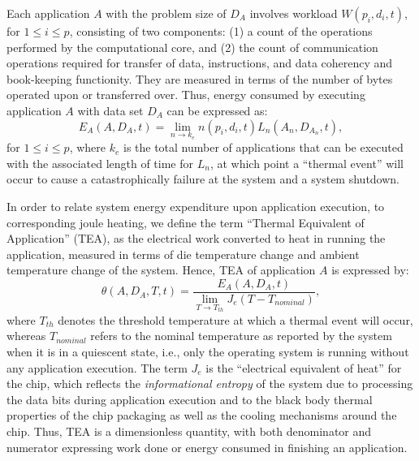 \documentclass[times, 10pt,twocolumn]{IEEEtran}
\begin{document}
Each application $A$ with the problem size of $D_{A}$ involves
workload $W(p_{i},d_{i},t)$, for $1 \leq i \leq p$, consisting of two components: 
(1) a count of the operations performed by the computational core, 
and (2) the count of communication operations required for transfer of data,
instructions, and data coherency and book-keeping functionity. 
They are measured in terms of the number of bytes operated upon or transferred over.
Thus, energy consumed by executing application $A$
with data set $D_{A}$ can be expressed as:
\begin{equation}
\label{eq:eworkload} E_{A}(A,D_{A},t) = \displaystyle \lim_{n \to k_{e}
}n (p_{i},d_{i},t) L_n(A_{n},D_{A_{n}},t),
\end{equation}
for $1\leq i \leq p$, where $k_{e}$ is the total
number of applications that can be executed with the associated length
of time for $L_{n}$, at which point a ``thermal event'' will occur
to cause a catastrophically failure at the system and a system shutdown.

In order to relate system energy expenditure upon
application execution, to corresponding joule heating, we define the term
``Thermal Equivalent of Application'' (TEA), as the
electrical work converted to heat in running the application,
measured in terms of die temperature change and ambient temperature
change of the system. 
Hence, TEA of application $A$ is expressed by:
\begin{equation}
\label{eq:tea} \theta(A,D_{A}, T,t) =
\frac{E_{A}(A,D_{A},t)}{\displaystyle \lim_{T \to T_{th}} J_e (T -
T_{nominal})},
\end{equation} 
where $T_{th}$ denotes the threshold temperature
at which a thermal event will occur, whereas $T_{nominal}$ refers to the
nominal temperature as reported by the system when it is in a quiescent
state, i.e., only the operating system is running without any application execution.
The term $J_{e}$ is the ``electrical equivalent of
heat'' for the chip, which reflects the \textit{informational
entropy} of the system due to processing the
data bits during application execution and to the
black body thermal properties of the chip packaging as well as the cooling
mechanisms around the chip. Thus, TEA is a dimensionless quantity, with
both denominator and numerator expressing work done or energy consumed
in finishing an application.
\end{document}
